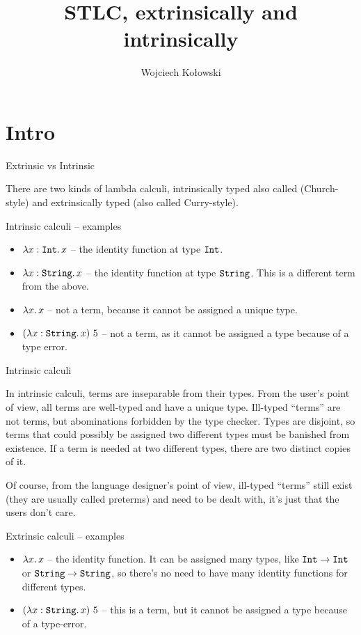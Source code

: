 \documentclass{beamer}
\title{STLC, extrinsically and intrinsically}
\author{Wojciech Kołowski}
\date{}
\begin{document}
\frame{\titlepage}

\section{Intro}

\begin{frame}{Extrinsic vs Intrinsic}

There are two kinds of lambda calculi, intrinsically typed also called (Church-style) and extrinsically typed (also called Curry-style).

\end{frame}

\begin{frame}{Intrinsic calculi -- examples}

\begin{itemize}
  \item $\lambda x : \texttt{Int}.\, x$ -- the identity function at type $\texttt{Int}$.
  \item $\lambda x : \texttt{String}.\, x$ -- the identity function at type $\texttt{String}$. This is a different term from the above.
  \item $\lambda x.\, x$ -- not a term, because it cannot be assigned a unique type.
  \item $(\lambda x : \texttt{String}.\, x)\ 5$ -- not a term, as it cannot be assigned a type because of a type error.
\end{itemize}

\end{frame}

\begin{frame}{Intrinsic calculi}

In intrinsic calculi, terms are inseparable from their types. From the user's point of view, all terms are well-typed and have a unique type. Ill-typed ``terms'' are not terms, but abominations forbidden by the type checker. Types are disjoint, so terms that could possibly be assigned two different types must be banished from existence. If a term is needed at two different types, there are two distinct copies of it.

\vspace{2em}

Of course, from the language designer's point of view, ill-typed ``terms'' still exist (they are usually called preterms) and need to be dealt with, it's just that the users don't care.

\end{frame}

\begin{frame}{Extrinsic calculi -- examples}

\begin{itemize}
  \item $\lambda x.\, x$ -- the identity function. It can be assigned many types, like $\texttt{Int} \to \texttt{Int}$ or $\texttt{String} \to \texttt{String}$, so there's no need to have many identity functions for different types.
  \item $(\lambda x : \texttt{String}.\, x)\ 5$ -- this is a term, but it cannot be assigned a type because of a type-error.
\end{itemize}

\end{frame}
\end{document}
